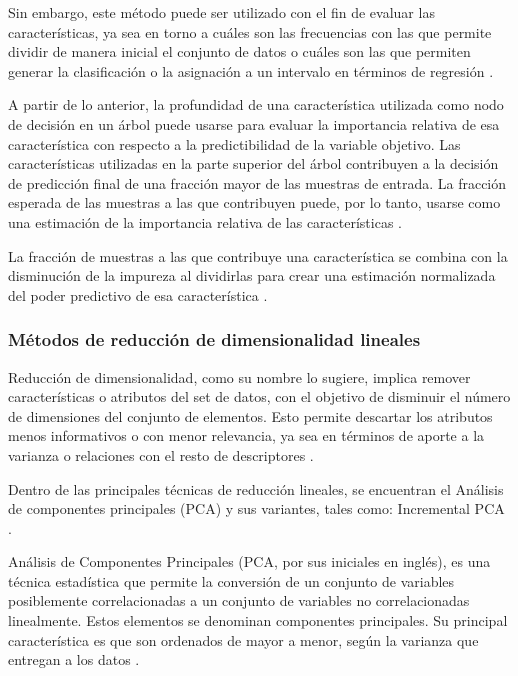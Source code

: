 Sin embargo, este método puede ser utilizado con el fin de evaluar las características, ya sea en torno a cuáles son las frecuencias con las que permite dividir de manera inicial el conjunto de datos o cuáles son las que permiten generar la clasificación o la asignación a un intervalo en términos de regresión \cite{saeys2008robust}. 

A partir de lo anterior, la profundidad de una característica utilizada como nodo de decisión en un árbol puede usarse para evaluar la importancia relativa de esa característica con respecto a la predictibilidad de la variable objetivo. Las características utilizadas en la parte superior del árbol contribuyen a la decisión de predicción final de una fracción mayor de las muestras de entrada. La fracción esperada de las muestras a las que contribuyen puede, por lo tanto, usarse como una estimación de la importancia relativa de las características \cite{granitto2006recursive}. 

La fracción de muestras a las que contribuye una característica se combina con la disminución de la impureza al dividirlas para crear una estimación normalizada del poder predictivo de esa característica \cite{saeys2008robust}.

\subsubsection{Métodos de reducción de dimensionalidad lineales}

Reducción de dimensionalidad, como su nombre lo sugiere, implica remover características o atributos del set de datos, con el objetivo de disminuir el número de dimensiones del conjunto de elementos. Esto permite descartar los atributos menos informativos o con menor relevancia, ya sea en términos de aporte a la varianza o relaciones con el resto de descriptores \cite{hinton2006reducing}.

Dentro de las principales técnicas de reducción lineales, se encuentran el Análisis de componentes principales (PCA) y sus variantes, tales como: Incremental PCA \cite{jolliffe2011principal}. 

Análisis de Componentes Principales (PCA, por sus iniciales en inglés), es una técnica estadística que permite la conversión de un conjunto de variables posiblemente correlacionadas a un conjunto de variables no correlacionadas linealmente. Estos elementos se denominan componentes principales. Su principal característica es que son ordenados de mayor a menor, según la varianza que entregan a los datos \cite{jolliffe2011principal}.

